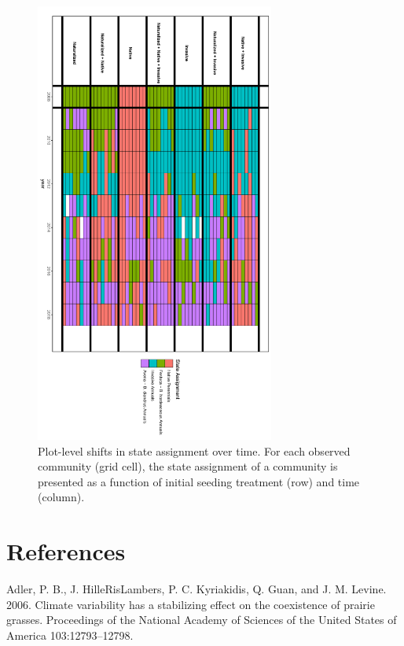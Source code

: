\documentclass[twoside,12pt,final]{ucthesis-CA2012}
\newlength{\cslhangindent}
\newenvironment{cslreferences}%
  {\setlength{\parindent}{0pt}%
  \everypar{\setlength{\hangindent}{\cslhangindent}}\ignorespaces}%
  {\par}
\begin{document}
\begin{ucmainmatter}
\begin{figure}
\includegraphics[width=0.7\textwidth,height=0.85\textheight]{figure/AppFig3_3.png}
\caption{Plot-level shifts in state assignment over time. For each observed community (grid cell), the state assignment of a community is presented as a function of initial seeding treatment (row) and time (column). \label{app-3-3}}
\end{figure}
\backmatter

\hypertarget{references}{%
\chapter*{References}\label{references}}


\noindent

\setlength{\parindent}{-0.20in}
\setlength{\leftskip}{0.20in}
\setlength{\parskip}{8pt}

\hypertarget{refs}{}
\begin{cslreferences}
\leavevmode\hypertarget{ref-Adler2006}{}%
Adler, P. B., J. HilleRisLambers, P. C. Kyriakidis, Q. Guan, and J. M. Levine. 2006. Climate variability has a stabilizing effect on the coexistence of prairie grasses. Proceedings of the National Academy of Sciences of the United States of America 103:12793--12798.


\end{cslreferences}
\end{ucmainmatter}
\end{document}
